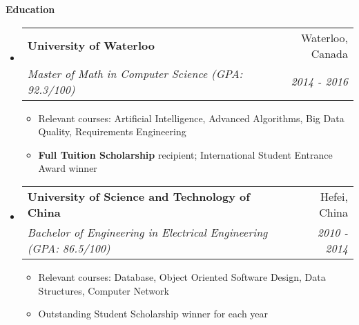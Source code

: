 \documentclass[letterpaper,10pt]{article}
\makeatletter
\newcommand{\resitem}[1]{\item #1 \vspace{-2pt}}
\newcommand{\resheading}[1]{{\large \colorbox{mygrey}{\begin{minipage}{\textwidth}{\textbf{#1 \vphantom{p\^{E}}}}\end{minipage}}}}
\newcommand{\ressubheading}[4]{
\begin{tabular*}{7.0in}{l@{\extracolsep{\fill}}r}
		\textbf{#1} & #2 \\
		\textit{#3} & \textit{#4} \\
\end{tabular*}\vspace{-6pt}}
\makeatother
\begin{document}
\resheading{Education}
\begin{itemize}
\itemsep0em
\item
	\ressubheading{University of Waterloo}{Waterloo, Canada}{Master of Math in Computer Science (GPA: 92.3/100)}{2014 - 2016}
	\begin{itemize}
		\resitem{Relevant courses: Artificial Intelligence, Advanced Algorithms, Big Data Quality, Requirements Engineering}
        \resitem{\textbf{Full Tuition Scholarship} recipient; International Student Entrance Award winner}
	\end{itemize}
\item
	\ressubheading{University of Science and Technology of China}{Hefei, China}{Bachelor of Engineering in Electrical Engineering (GPA: 86.5/100)}{2010 - 2014}
	\begin{itemize}
		\resitem{Relevant courses: Database, Object Oriented Software Design, Data Structures, Computer Network}
        \resitem{Outstanding Student Scholarship winner for each year}
	\end{itemize}

\end{itemize}
\end{document}
